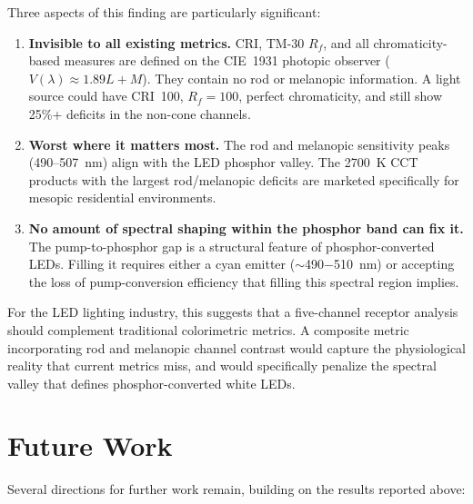 \documentclass[11pt]{article}
\begin{document}
Three aspects of this finding are particularly significant:
\begin{enumerate}
\item \textbf{Invisible to all existing metrics.}  CRI, TM-30 $R_f$,
  and all chromaticity-based measures are defined on the CIE~1931
  photopic observer ($V(\lambda) \approx 1.89L + M$).  They contain
  no rod or melanopic information.  A light source could have
  CRI~100, $R_f = 100$, perfect chromaticity, and still show 25\%+
  deficits in the non-cone channels.
\item \textbf{Worst where it matters most.}  The rod and melanopic
  sensitivity peaks (490--507~nm) align with the LED phosphor valley.
  The 2700~K CCT products with the largest rod/melanopic deficits
  are marketed specifically for mesopic residential environments.
\item \textbf{No amount of spectral shaping within the phosphor band
  can fix it.}  The pump-to-phosphor gap is a structural feature of
  phosphor-converted LEDs.  Filling it requires either a cyan emitter
  ($\sim$490$-$510~nm) or accepting the loss of pump-conversion
  efficiency that filling this spectral region implies.
\end{enumerate}

For the LED lighting industry, this suggests that a five-channel
receptor analysis should complement traditional colorimetric metrics.
A composite metric incorporating rod and melanopic channel contrast
would capture the physiological reality that current metrics miss,
and would specifically penalize the spectral valley that defines
phosphor-converted white LEDs.


\section{Future Work}
\label{sec:future}

Several directions for further work remain, building on the results
reported above:
\end{document}
